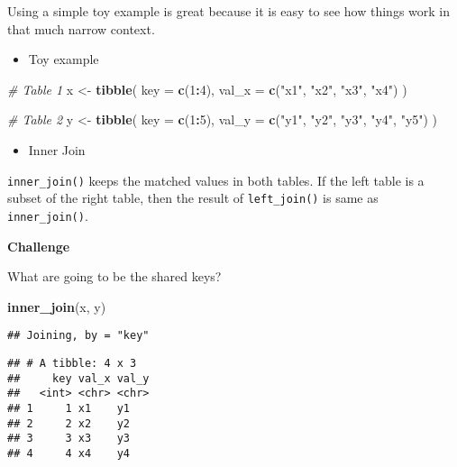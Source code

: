 \documentclass[
]{book}
\newenvironment{Shaded}{\begin{snugshade}}{\end{snugshade}}
\newcommand{\CommentTok}[1]{\textcolor[rgb]{0.56,0.35,0.01}{\textit{#1}}}
\newcommand{\DataTypeTok}[1]{\textcolor[rgb]{0.13,0.29,0.53}{#1}}
\newcommand{\DecValTok}[1]{\textcolor[rgb]{0.00,0.00,0.81}{#1}}
\newcommand{\KeywordTok}[1]{\textcolor[rgb]{0.13,0.29,0.53}{\textbf{#1}}}
\newcommand{\NormalTok}[1]{#1}
\newcommand{\OperatorTok}[1]{\textcolor[rgb]{0.81,0.36,0.00}{\textbf{#1}}}
\newcommand{\StringTok}[1]{\textcolor[rgb]{0.31,0.60,0.02}{#1}}
\providecommand{\tightlist}{%
  \setlength{\itemsep}{0pt}\setlength{\parskip}{0pt}}
\begin{document}
Using a simple toy example is great because it is easy to see how things work in that much narrow context.

\begin{itemize}
\tightlist
\item
  Toy example
\end{itemize}

\begin{Shaded}
\begin{Highlighting}[]
\CommentTok{\# Table 1}
\NormalTok{x \textless{}{-}}\StringTok{ }\KeywordTok{tibble}\NormalTok{(}
  \DataTypeTok{key =} \KeywordTok{c}\NormalTok{(}\DecValTok{1}\OperatorTok{:}\DecValTok{4}\NormalTok{),}
  \DataTypeTok{val\_x =} \KeywordTok{c}\NormalTok{(}\StringTok{"x1"}\NormalTok{, }\StringTok{"x2"}\NormalTok{, }\StringTok{"x3"}\NormalTok{, }\StringTok{"x4"}\NormalTok{)}
\NormalTok{)}

\CommentTok{\# Table 2}
\NormalTok{y \textless{}{-}}\StringTok{ }\KeywordTok{tibble}\NormalTok{(}
  \DataTypeTok{key =} \KeywordTok{c}\NormalTok{(}\DecValTok{1}\OperatorTok{:}\DecValTok{5}\NormalTok{),}
  \DataTypeTok{val\_y =} \KeywordTok{c}\NormalTok{(}\StringTok{"y1"}\NormalTok{, }\StringTok{"y2"}\NormalTok{, }\StringTok{"y3"}\NormalTok{, }\StringTok{"y4"}\NormalTok{, }\StringTok{"y5"}\NormalTok{)}
\NormalTok{)}
\end{Highlighting}
\end{Shaded}

\begin{itemize}
\tightlist
\item
  Inner Join
\end{itemize}

\texttt{inner\_join()} keeps the matched values in both tables. If the left table is a subset of the right table, then the result of \texttt{left\_join()} is same as \texttt{inner\_join()}.

\textbf{Challenge}

What are going to be the shared keys?

\begin{Shaded}
\begin{Highlighting}[]
\KeywordTok{inner\_join}\NormalTok{(x, y)}
\end{Highlighting}
\end{Shaded}

\begin{verbatim}
## Joining, by = "key"
\end{verbatim}

\begin{verbatim}
## # A tibble: 4 x 3
##     key val_x val_y
##   <int> <chr> <chr>
## 1     1 x1    y1   
## 2     2 x2    y2   
## 3     3 x3    y3   
## 4     4 x4    y4
\end{verbatim}
\end{document}
